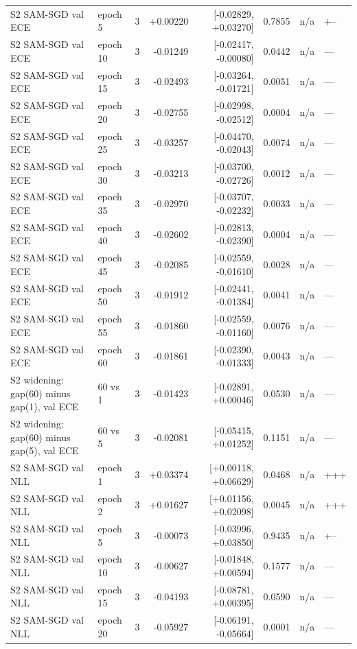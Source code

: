 \documentclass[11pt,letterpaper]{article}
\begin{document}
{\begin{longtable}{>{\raggedright\arraybackslash}p{3.6cm}lrrrrrl}
S2 SAM-SGD val ECE & epoch 5 & 3 & +0.00220 & [-0.02829, +0.03270] & 0.7855 & n/a & +-- \\
S2 SAM-SGD val ECE & epoch 10 & 3 & -0.01249 & [-0.02417, -0.00080] & 0.0442 & n/a & --- \\
S2 SAM-SGD val ECE & epoch 15 & 3 & -0.02493 & [-0.03264, -0.01721] & 0.0051 & n/a & --- \\
S2 SAM-SGD val ECE & epoch 20 & 3 & -0.02755 & [-0.02998, -0.02512] & 0.0004 & n/a & --- \\
S2 SAM-SGD val ECE & epoch 25 & 3 & -0.03257 & [-0.04470, -0.02043] & 0.0074 & n/a & --- \\
S2 SAM-SGD val ECE & epoch 30 & 3 & -0.03213 & [-0.03700, -0.02726] & 0.0012 & n/a & --- \\
S2 SAM-SGD val ECE & epoch 35 & 3 & -0.02970 & [-0.03707, -0.02232] & 0.0033 & n/a & --- \\
S2 SAM-SGD val ECE & epoch 40 & 3 & -0.02602 & [-0.02813, -0.02390] & 0.0004 & n/a & --- \\
S2 SAM-SGD val ECE & epoch 45 & 3 & -0.02085 & [-0.02559, -0.01610] & 0.0028 & n/a & --- \\
S2 SAM-SGD val ECE & epoch 50 & 3 & -0.01912 & [-0.02441, -0.01384] & 0.0041 & n/a & --- \\
S2 SAM-SGD val ECE & epoch 55 & 3 & -0.01860 & [-0.02559, -0.01160] & 0.0076 & n/a & --- \\
S2 SAM-SGD val ECE & epoch 60 & 3 & -0.01861 & [-0.02390, -0.01333] & 0.0043 & n/a & --- \\
S2 widening: gap(60) minus gap(1), val ECE & 60 vs 1 & 3 & -0.01423 & [-0.02891, +0.00046] & 0.0530 & n/a & --- \\
S2 widening: gap(60) minus gap(5), val ECE & 60 vs 5 & 3 & -0.02081 & [-0.05415, +0.01252] & 0.1151 & n/a & --- \\
S2 SAM-SGD val NLL & epoch 1 & 3 & +0.03374 & [+0.00118, +0.06629] & 0.0468 & n/a & +++ \\
S2 SAM-SGD val NLL & epoch 2 & 3 & +0.01627 & [+0.01156, +0.02098] & 0.0045 & n/a & +++ \\
S2 SAM-SGD val NLL & epoch 5 & 3 & -0.00073 & [-0.03996, +0.03850] & 0.9435 & n/a & +-- \\
S2 SAM-SGD val NLL & epoch 10 & 3 & -0.00627 & [-0.01848, +0.00594] & 0.1577 & n/a & --- \\
S2 SAM-SGD val NLL & epoch 15 & 3 & -0.04193 & [-0.08781, +0.00395] & 0.0590 & n/a & --- \\
S2 SAM-SGD val NLL & epoch 20 & 3 & -0.05927 & [-0.06191, -0.05664] & 0.0001 & n/a & --- \\

\end{longtable}}
\end{document}
